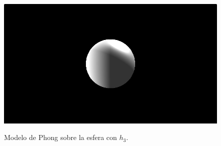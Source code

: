 \begin{figure}[H]
  \centering
  \captionsetup{justification=centering}%
  \includegraphics[width=1.0\textwidth]{secciones/imagenes/lightmodel/phong.png}\label{fig:phong}
  \caption{Modelo de Phong sobre la esfera con \(h_3\).}
\end{figure}
\newpage

